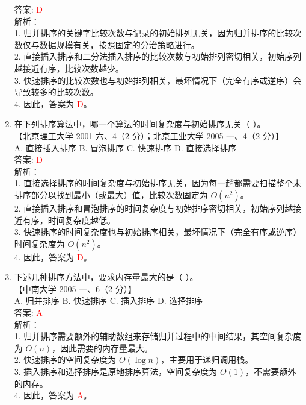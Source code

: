 \documentclass[lang=cn,newtx,10pt,scheme=chinese]{../../../elegantbook}
\begin{document}
\begin{enumerate}
    答案: \textcolor{red}{D} \\

    解析：\\
    1. 归并排序的关键字比较次数与记录的初始排列无关，因为归并排序的比较次数仅与数据规模有关，按照固定的分治策略进行。\\
    2. 直接插入排序和二分法插入排序的比较次数与初始排列密切相关，初始序列越接近有序，比较次数越少。\\
    3. 快速排序的比较次数也与初始排列相关，最坏情况下（完全有序或逆序）会导致较多的比较次数。\\
    4. 因此，答案为 \textcolor{red}{D}。\\ 

    \item 在下列排序算法中，哪一个算法的时间复杂度与初始排序无关（ ）。\\
    【北京理工大学 2001 六、4（2 分）；北京工业大学 2005 一、4（2 分）】\\

    A. 直接插入排序 \quad B. 冒泡排序 \quad C. 快速排序 \quad D. 直接选择排序 \\

    答案: \textcolor{red}{D} \\

    解析：\\
    1. 直接选择排序的时间复杂度与初始排序无关，因为每一趟都需要扫描整个未排序部分以找到最小（或最大）值，比较次数固定为 $O(n^2)$。\\
    2. 直接插入排序和冒泡排序的时间复杂度与初始排序密切相关，初始序列越接近有序，时间复杂度越低。\\
    3. 快速排序的时间复杂度也与初始排序相关，最坏情况下（完全有序或逆序）时间复杂度为 $O(n^2)$。\\
    4. 因此，答案为 \textcolor{red}{D}。\\  

    \item 下述几种排序方法中，要求内存量最大的是（ ）。\\
    【中南大学 2005 一、6（2 分）】\\

    A. 归并排序 \quad B. 快速排序 \quad C. 插入排序 \quad D. 选择排序 \\

    答案: \textcolor{red}{A} \\

    解析：\\
    1. 归并排序需要额外的辅助数组来存储归并过程中的中间结果，其空间复杂度为 $O(n)$，因此需要的内存量最大。\\
    2. 快速排序的空间复杂度为 $O(\log n)$，主要用于递归调用栈。\\
    3. 插入排序和选择排序是原地排序算法，空间复杂度为 $O(1)$，不需要额外的内存。\\
    4. 因此，答案为 \textcolor{red}{A}。\\ 


\end{enumerate}
\end{document}
